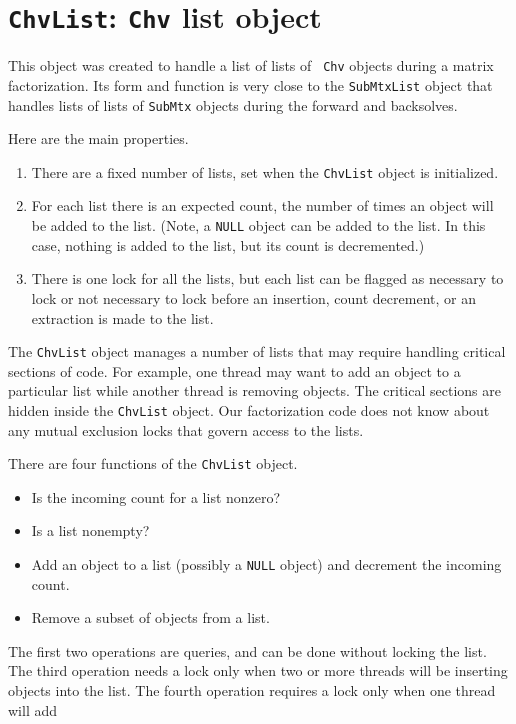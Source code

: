 \par
\chapter{{\tt ChvList}: {\tt Chv} list object }
\par
This object was created to handle a list of lists of {\tt
Chv} objects during a matrix factorization.
Its form and function is very close to the {\tt SubMtxList} object
that handles lists of lists of {\tt SubMtx} objects during the
forward and backsolves.
\par
Here are the main properties.
\begin{enumerate}
\item
There are a fixed number of lists, set when the {\tt ChvList}
object is initialized.
\item
For each list there is an expected count, the number of times an
object will be added to the list. (Note, a {\tt NULL} object can be
added to the list. In this case, nothing is added to the list,
but its count is decremented.)
\item
There is one lock for all the lists, but each list can be flagged
as necessary to lock or not necessary to lock before an insertion, 
count decrement, or an extraction is made to the list.
\end{enumerate}
\par
The {\tt ChvList} object manages a number of lists that may require
handling critical sections of code.
For example, one thread may want to add an object to a particular
list while another thread is removing objects.
The critical sections are hidden inside the {\tt ChvList} object.
Our factorization code does not know about any mutual exclusion
locks that govern access to the lists.
\par
There are four functions of the {\tt ChvList} object.
\begin{itemize}
\item
Is the incoming count for a list nonzero?
\item
Is a list nonempty?
\item
Add an object to a list (possibly a {\tt NULL} object) and
decrement the incoming count.
\item
Remove a subset of objects from a list.
\end{itemize}
The first two operations are queries, and can be done without
locking the list.
The third operation needs a lock only when two or more threads will
be inserting objects into the list.
The fourth operation requires a lock only when one thread will add
